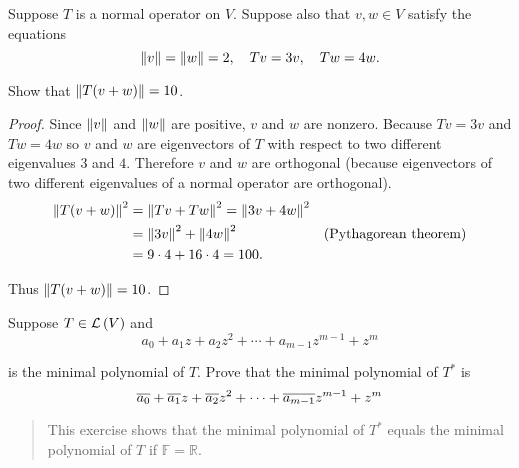 \begin{exercise}
    Suppose $T$ is a normal operator on $V$. Suppose also that $v, w \in V$ satisfy the equations
    \[
        \left\Vert{v}\right\Vert = \left\Vert{w}\right\Vert = 2,\quad Tv = 3v,\quad Tw = 4w.
    \]

    Show that $\left\Vert{T(v + w)}\right\Vert = 10$.
\end{exercise}

\begin{proof}
    Since $\left\Vert{v}\right\Vert$ and $\left\Vert{w}\right\Vert$ are positive, $v$ and $w$ are nonzero. Because $Tv = 3v$ and $Tw = 4w$ so $v$ and $w$ are eigenvectors of $T$ with respect to two different eigenvalues $3$ and $4$. Therefore $v$ and $w$ are orthogonal (because eigenvectors of two different eigenvalues of a normal operator are orthogonal).
    \begin{align*}
        \left\Vert{T(v + w)}\right\Vert^{2} & = \left\Vert{Tv + Tw}\right\Vert^{2} = \left\Vert{3v + 4w}\right\Vert^{2} \\
                            & = \left\Vert{3v}\right\Vert^{2} + \left\Vert{4w}\right\Vert^{2} & \text{(Pythagorean theorem)} \\
                            & = 9\cdot 4 + 16\cdot 4 = 100.
    \end{align*}

    Thus $\left\Vert{T(v + w)}\right\Vert = 10$.
\end{proof}
\newpage

\begin{exercise}\label{chapter7:sectionA:exercise24}
    Suppose $T\in\mathcal{L}\left({V}\right)$ and
    \[
        a_{0} + a_{1}z + a_{2}z^{2} + \cdots + a_{m-1}z^{m-1} + z^{m}
    \]

    is the minimal polynomial of $T$. Prove that the minimal polynomial of $T^{*}$ is
    \[
        \overline{a_{0}} + \overline{a_{1}}z + \overline{a_{2}}z^{2} + \cdots + \overline{a_{m-1}}z^{m-1} + z^{m}
    \]
\end{exercise}

\begin{quote}
    This exercise shows that the minimal polynomial of $T^{*}$ equals the minimal polynomial of $T$ if $\mathbb{F} = \mathbb{R}$.
\end{quote}

